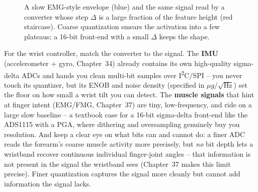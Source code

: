 \begin{figure}[H]
\centering
{}
\caption{A slow EMG-style envelope (blue) and the same signal read by a converter whose step
$\Delta$ is a large fraction of the feature height (red staircase). Coarse quantization smears the
activation into a few plateaus; a 16-bit front-end with a small $\Delta$ keeps the shape.}
\label{ch19:fig-emg}
\end{figure}

\begin{goalbox}
For the wrist controller, match the converter to the signal. The \textbf{IMU} (accelerometer +
gyro, Chapter~34) already contains its own high-quality sigma-delta ADCs and hands you clean
multi-bit samples over I\textsuperscript{2}C/SPI -- you never touch its quantizer, but its ENOB
and noise density (specified in $\mu g/\sqrt{\mathrm{Hz}}$) set the floor on how small a wrist
tilt you can detect. The \textbf{muscle signals} that hint at finger intent (EMG/FMG,
Chapter~37) are tiny, low-frequency, and ride on a large slow baseline -- a textbook case for a
16-bit sigma-delta front-end like the ADS1115 with a PGA, where dithering and oversampling
genuinely buy you resolution. And keep a clear eye on what bits can and cannot do: a finer ADC reads
the forearm's coarse muscle activity more precisely, but \emph{no} bit depth lets a wristband
recover continuous individual finger-joint angles -- that information is not present in the signal
the wristband sees (Chapter~37 makes this limit precise). Finer quantization captures the signal more
cleanly but cannot add information the signal lacks.
\end{goalbox}

